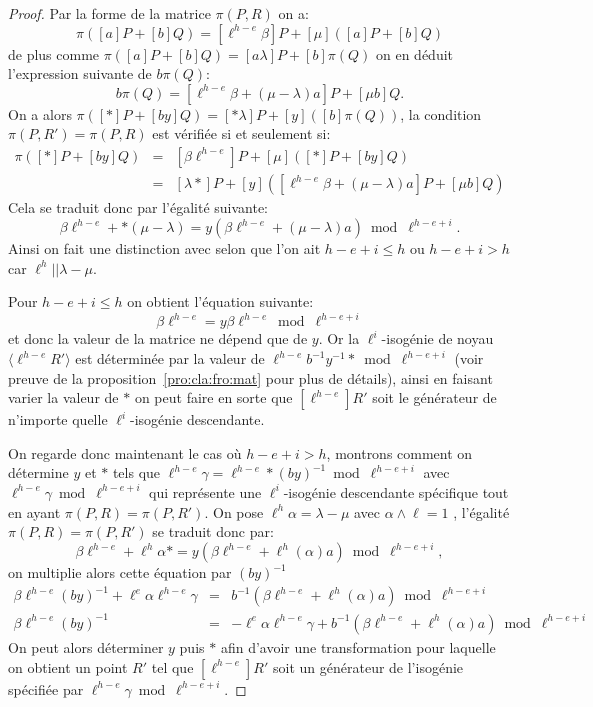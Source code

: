 \documentclass[10pt,a4paper]{book}
\theoremstyle{plain}
\theoremstyle{definition}
\theoremstyle{definition}
\theoremstyle{definition}
\theoremstyle{definition}
\theoremstyle{remark}
\theoremstyle{remark}
\theoremstyle{definition}
\begin{document}
\begin{proof}
Par la forme de la matrice $\pi(P,R)$ on a:
\[ \pi([a]P+[b]Q)=[\ell^{h-e} \beta] P + [\mu] ([a]P+[b]Q)\]
de plus comme $\pi([a]P+[b]Q)=[a \lambda ]P + [b] \pi(Q)$ on en déduit 
l'expression suivante de $b\pi(Q)$:
\[ b \pi(Q)=[\ell^{h-e}\beta + (\mu - \lambda)a]P + [\mu b] Q. \]
On a alors $\pi([*]P+[by]Q)=[*\lambda]P+[y]([b]\pi(Q))$, la condition 
$\pi(P,R')=\pi(P,R)$ est vérifiée si et seulement si:
\begin{eqnarray*}
\pi([*]P+[by]Q) &=& [\beta \ell^{h-e}] P + [\mu]([*]P+[by]Q) \\
				&=& [\lambda *]P + [y]([\ell^{h-e}\beta + (\mu - \lambda)a]P + [\mu b] Q)
\end{eqnarray*}
Cela se traduit donc par l'égalité suivante:
\[ \beta \ell^{h-e} + *(\mu-\lambda)=y(\beta \ell^{h-e}+(\mu - \lambda )a) \bmod \ell^{h-e+i}. \]
Ainsi on fait une distinction avec selon que l'on ait $h-e+i \leqslant h$ ou 
$h-e+i > h$ car $\ell^h || \lambda - \mu$. 

Pour $h-e+i \leqslant h$ on obtient l'équation suivante:
\[\beta \ell^{h-e} = y\beta \ell^{h-e}  \bmod \ell^{h-e+i} \]
et donc la valeur de la matrice ne dépend que de $y$. Or la
$\ell^i$-isogénie de noyau $\langle \ell^{h-e}R' \rangle$ est déterminée par la 
valeur de $\ell^{h-e}b^{-1}y^{-1}* \bmod \ell^{h-e+i}$ (voir preuve de la 
proposition~\ref{pro:cla:fro:mat} pour plus de détails), ainsi en faisant 
varier la valeur de $*$ on peut faire en sorte que $[\ell^{h-e}]R'$ soit le 
générateur de n'importe quelle $\ell^{i}$-isogénie descendante.

On regarde donc maintenant le cas où $h-e+i>h$, montrons comment on détermine
$y$ et $*$  tels que $\ell^{h-e}\gamma=\ell^{h-e}*(by)^{-1} \bmod 
\ell^{h-e+i}$ avec $\ell^{h-e}\gamma \bmod \ell^{h-e+i}$ qui représente une 
$\ell^i$-isogénie descendante spécifique tout en ayant $\pi(P,R)=\pi(P,R')$.
On pose $\ell^{h} \alpha = \lambda - \mu$ avec $\alpha \wedge \ell=1$
, l'égalité $\pi(P,R)=\pi(P,R')$ se traduit donc par:
\[ \beta \ell^{h-e} + \ell^{h}\alpha *=y(\beta \ell^{h-e}+\ell^{h}(\alpha)a) \bmod \ell^{h-e+i}, \]
on multiplie alors cette équation par $(by)^{-1}$
\begin{eqnarray*}
\beta \ell^{h-e}(by)^{-1} + \ell^{e}\alpha \ell^{h-e} \gamma &=& b^{-1}(\beta \ell^{h-e}+\ell^{h}(\alpha)a) \bmod \ell^{h-e+i} \\
\beta \ell^{h-e}(by)^{-1} &=& - \ell^{e}\alpha \ell^{h-e} \gamma + b^{-1}(\beta \ell^{h-e}+\ell^{h}(\alpha)a) \bmod \ell^{h-e+i}
\end{eqnarray*}
On peut alors déterminer $y$ puis $*$ afin d'avoir une transformation pour 
laquelle on obtient un point $R'$ tel que $[\ell^{h-e}]R'$ soit un générateur 
de l'isogénie spécifiée par $\ell^{h-e}\gamma \bmod \ell^{h-e+i}$.
\end{proof}
\end{document}
